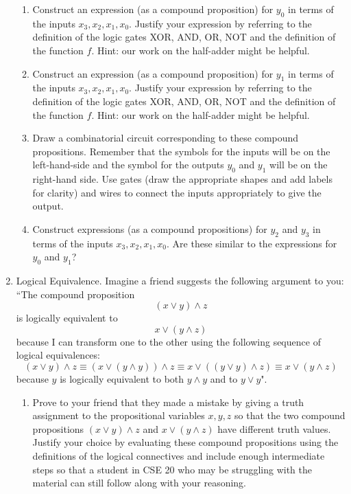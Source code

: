 \begin{enumerate}[labelindent=0pt, leftmargin=0pt]
\begin{enumerate}
        \item\gradeCorrect
        Construct an expression (as a compound proposition) for $y_0$ in terms of the inputs 
        $x_3, x_2, x_1, x_0$. Justify your expression by referring to the definition of the logic 
        gates XOR, AND, OR, NOT and the definition of the function $f$. Hint: our work on the half-adder might 
        be helpful.
        \item\gradeCorrect
        Construct an expression (as a compound proposition) for $y_1$ in terms of the inputs 
        $x_3, x_2, x_1, x_0$. Justify your expression by referring to the definition of the logic 
        gates XOR, AND, OR, NOT and the definition of the function $f$. Hint: our work on the half-adder might 
        be helpful.
        \item\gradeComplete Draw a combinatorial circuit corresponding to these compound propositions.
        Remember that the symbols for the inputs will be on the left-hand-side and 
        the symbol for the outputs $y_0$ and $y_1$ will be on the right-hand side. Use gates (draw the appropriate
        shapes and add labels for clarity) and wires to connect the inputs appropriately to give the output.
        \item\gradeComplete Construct expressions (as a compound propositions) for $y_2$ and $y_3$ 
        in terms of the inputs  $x_3, x_2, x_1, x_0$. Are these similar to the expressions for $y_0$ and $y_1$?
        \end{enumerate}
        \item Logical Equivalence. Imagine a friend suggests the following argument to you: ``The compound proposition
        \[
        (x \lor y) \land z
        \]
        is logically equivalent to 
        \[
        x \lor (y \land z)
        \]
        because I can transform one to the other using the following sequence of logical equivalences: 
        \[
           (x \lor y) \land z \equiv
           (x \lor (y \land y)) \land z \equiv
           x \lor ( (y \lor y) \land z) \equiv x \lor (y \land z) 
        \]
        because $y$ is logically equivalent to both $y \land y$ and to $y \lor y$".
        
        \begin{enumerate}
        \item\gradeCorrect Prove to your friend that they made a mistake by giving a truth
        assignment to the propositional variables $x,y,z$ so that 
        the two compound propositions 
        $ (x \lor y) \land z$ and $ x \lor (y \land z)$ have different truth values.
        Justify your choice by evaluating these compound propositions using the definitions of the logical connectives 
        and include enough intermediate steps so that a student in CSE 20 who may be 
        struggling with the material can still follow along with your reasoning.
        

\end{enumerate}
\end{enumerate}
